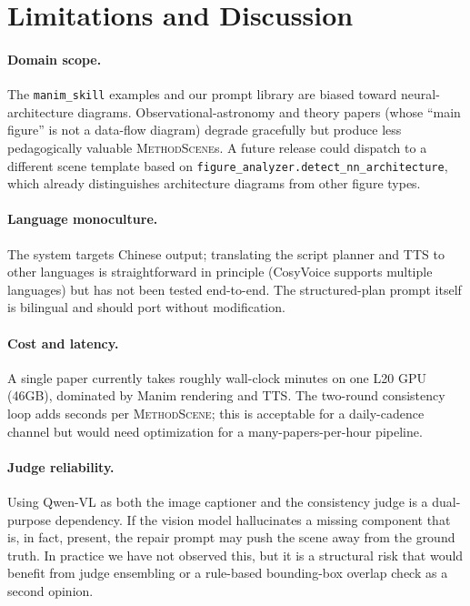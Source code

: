 \documentclass[11pt,a4paper]{article}
\begin{document}
\section{Limitations and Discussion}
\label{sec:limitations}

\paragraph{Domain scope.}
The \texttt{manim\_skill} examples and our prompt library are biased toward neural-architecture diagrams. Observational-astronomy and theory papers (whose ``main figure'' is not a data-flow diagram) degrade gracefully but produce less pedagogically valuable \textsc{MethodScene}s. A future release could dispatch to a different scene template based on \texttt{figure\_analyzer.detect\_nn\_architecture}, which already distinguishes architecture diagrams from other figure types.

\paragraph{Language monoculture.}
The system targets Chinese output; translating the script planner and TTS to other languages is straightforward in principle (CosyVoice supports multiple languages) but has not been tested end-to-end. The structured-plan prompt itself is bilingual and should port without modification.

\paragraph{Cost and latency.}
A single paper currently takes roughly %
wall-clock minutes on one L20 GPU (46GB), dominated by Manim rendering and TTS. The two-round consistency loop adds %
seconds per \textsc{MethodScene}; this is acceptable for a daily-cadence channel but would need optimization for a many-papers-per-hour pipeline.

\paragraph{Judge reliability.}
Using Qwen-VL as both the image captioner and the consistency judge is a dual-purpose dependency. If the vision model hallucinates a missing component that is, in fact, present, the repair prompt may push the scene away from the ground truth. In practice we have not observed this, but it is a structural risk that would benefit from judge ensembling or a rule-based bounding-box overlap check as a second opinion.
\end{document}
